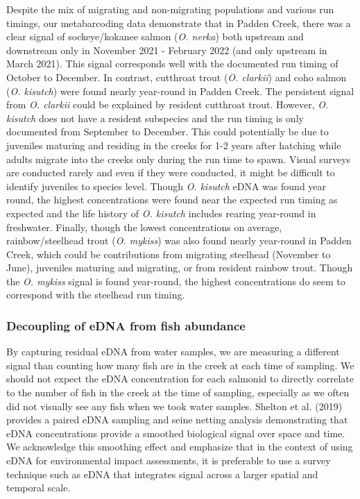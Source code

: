 \documentclass[
]{article}
\begin{document}
Despite the mix of migrating and non-migrating populations and various
run timings, our metabarcoding data demonstrate that in Padden Creek,
there was a clear signal of sockeye/kokanee salmon (\emph{O. nerka})
both upstream and downstream only in November 2021 - February 2022 (and
only upstream in March 2021). This signal corresponds well with the
documented run timing of October to December. In contrast, cutthroat
trout (\emph{O. clarkii}) and coho salmon (\emph{O. kisutch}) were found
nearly year-round in Padden Creek. The persistent signal from \emph{O.
clarkii} could be explained by resident cutthroat trout. However,
\emph{O. kisutch} does not have a resident subspecies and the run timing
is only documented from September to December. This could potentially be
due to juveniles maturing and residing in the creeks for 1-2 years after
hatching while adults migrate into the creeks only during the run time
to spawn. Visual surveys are conducted rarely and even if they were
conducted, it might be difficult to identify juveniles to species level.
Though \emph{O. kisutch} eDNA was found year round, the highest
concentrations were found near the expected run timing as expected and
the life history of \emph{O. kisutch} includes rearing year-round in
freshwater. Finally, though the lowest concentrations on average,
rainbow/steelhead trout (\emph{O. mykiss}) was also found nearly
year-round in Padden Creek, which could be contributions from migrating
steelhead (November to June), juveniles maturing and migrating, or from
resident rainbow trout. Though the \emph{O. mykiss} signal is found
year-round, the highest concentrations do seem to correspond with the
steelhead run timing.

\hypertarget{decoupling-of-edna-from-fish-abundance}{%
\subsubsection{Decoupling of eDNA from fish
abundance}\label{decoupling-of-edna-from-fish-abundance}}

By capturing residual eDNA from water samples, we are measuring a
different signal than counting how many fish are in the creek at each
time of sampling. We should not expect the eDNA concentration for each
salmonid to directly correlate to the number of fish in the creek at the
time of sampling, especially as we often did not visually see any fish
when we took water samples. Shelton et al. (2019) provides a paired eDNA
sampling and seine netting analysis demonstrating that eDNA
concentrations provide a smoothed biological signal over space and time.
We acknowledge this smoothing effect and emphasize that in the context
of using eDNA for environmental impact assessments, it is preferable to
use a survey technique such as eDNA that integrates signal across a
larger spatial and temporal scale.
\end{document}
